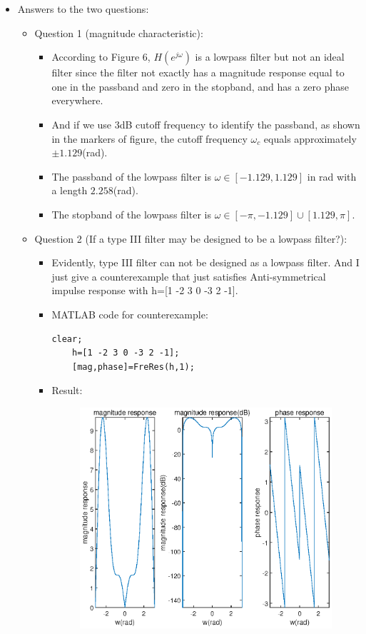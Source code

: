 \documentclass[onecolumn,oneside]{SUSTechHomework}
\begin{document}
\begin{itemize}
    \item Answers to the two questions:
    \begin{itemize}
        \item Question 1 (magnitude characteristic):
        \begin{itemize}
            \item According to Figure 6, $H(e^{j\omega})$ is a lowpass filter but not an ideal filter since the filter 
            not exactly has a magnitude response equal to one in the passband and zero in the stopband, and has a zero phase everywhere. 
            \item And if we use $3$dB cutoff frequency to identify the passband, 
            as shown in the markers of figure, the cutoff frequency $\omega_c$ equals approximately $\pm 1.129$(rad).
            \item The passband of the lowpass filter is $\omega \in [-1.129,1.129]$ in rad with a length $2.258$(rad).
            \item The stopband of the lowpass filter is $\omega \in [-\pi,-1.129]\cup[1.129,\pi]$.
        \end{itemize}
        \item Question 2 (If a type III filter may be designed to be a lowpass filter?):
        \begin{itemize}
            \item Evidently, type III filter can not be designed as a lowpass filter. And I just give a counterexample that just satisfies Anti-symmetrical impulse response with h=[1 -2 3 0 -3 2 -1].
            \item MATLAB code for counterexample:
\begin{lstlisting}[title=\textbf{q6\_3\_1b.m}]
    clear;
    h=[1 -2 3 0 -3 2 -1];
    [mag,phase]=FreRes(h,1);
\end{lstlisting}
        \item Result:
        \begin{figure}[H]
            \centering
            \includegraphics[width=170mm]{pictures/q6_3_1(c).eps}

\end{figure}
\end{itemize}
\end{itemize}
\end{itemize}
\end{document}
